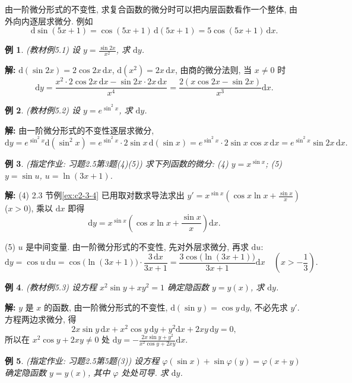 \documentclass[UTF8,openany]{ctexbook}
\theoremstyle{chinesetextbook}
\newtheorem{example}{例}[section]
\newenvironment{cnsolution}{\par\indent\textbf{解:} \ignorespaces}{\par}
\newcommand{\dd}{\mathrm d}
\begin{document}
由一阶微分形式的不变性, 求复合函数的微分时可以把内层函数看作一个整体, 由外向内逐层求微分. 例如
\[
\dd\sin(5x+1)=\cos(5x+1)\,\dd(5x+1)=5\cos(5x+1)\,\dd x.
\]
\begin{example}\label{ex:c2-5-1}
\textnormal{(教材例5.1)} 设 $\displaystyle y=\frac{\sin2x}{x^2}$, 求 $\dd y$.
\end{example}
\begin{cnsolution}
$\dd(\sin2x)=2\cos2x\,\dd x$, $\dd(x^2)=2x\,\dd x$, 由商的微分法则, 当 $x\ne0$ 时
\[
\dd y=\frac{x^2\cdot2\cos2x\,\dd x-\sin2x\cdot2x\,\dd x}{x^4}=\frac{2(x\cos2x-\sin2x)}{x^3}\dd x.
\]
\end{cnsolution}
\begin{example}\label{ex:c2-5-2}
\textnormal{(教材例5.2)} 设 $y=e^{\sin^2x}$, 求 $\dd y$.
\end{example}
\begin{cnsolution}
由一阶微分形式的不变性逐层求微分,
\[
\dd y=e^{\sin^2x}\dd(\sin^2x)=e^{\sin^2x}\cdot2\sin x\,\dd(\sin x)=e^{\sin^2x}\cdot2\sin x\cos x\,\dd x=e^{\sin^2x}\sin2x\,\dd x.
\]
\end{cnsolution}
\begin{example}\label{ex:c2-h5-3}
\textnormal{(指定作业: 习题2.5第3题(4)(5))} 求下列函数的微分: (4) $y=x^{\sin x}$; (5) $y=\sin u$, $u=\ln(3x+1)$.
\end{example}
\begin{cnsolution}
(4) 2.3 节例\ref{ex:c2-3-4} 已用取对数求导法求出 $\displaystyle y'=x^{\sin x}\left(\cos x\ln x+\frac{\sin x}x\right)$ ($x>0$), 乘以 $\dd x$ 即得
\[
\dd y=x^{\sin x}\left(\cos x\ln x+\frac{\sin x}x\right)\dd x.
\]

(5) $u$ 是中间变量. 由一阶微分形式的不变性, 先对外层求微分, 再求 $\dd u$:
\[
\dd y=\cos u\,\dd u=\cos\bigl(\ln(3x+1)\bigr)\cdot\frac{3\,\dd x}{3x+1}=\frac{3\cos\bigl(\ln(3x+1)\bigr)}{3x+1}\dd x\quad\left(x>-\frac13\right).
\]
\end{cnsolution}
\begin{example}\label{ex:c2-5-3}
\textnormal{(教材例5.3)} 设方程 $x^2\sin y+xy^2=1$ 确定隐函数 $y=y(x)$, 求 $\dd y$.
\end{example}
\begin{cnsolution}
$y$ 是 $x$ 的函数, 由一阶微分形式的不变性, $\dd(\sin y)=\cos y\,\dd y$, 不必先求 $y'$. 方程两边求微分, 得
\[
2x\sin y\,\dd x+x^2\cos y\,\dd y+y^2\dd x+2xy\,\dd y=0,
\]
所以在 $x^2\cos y+2xy\ne0$ 处 $\displaystyle\dd y=-\frac{2x\sin y+y^2}{x^2\cos y+2xy}\dd x$.
\end{cnsolution}
\begin{example}\label{ex:c2-h5-5}
\textnormal{(指定作业: 习题2.5第5题(3))} 设方程 $\varphi(\sin x)+\sin\varphi(y)=\varphi(x+y)$ 确定隐函数 $y=y(x)$, 其中 $\varphi$ 处处可导. 求 $\dd y$.
\end{example}
\end{document}
